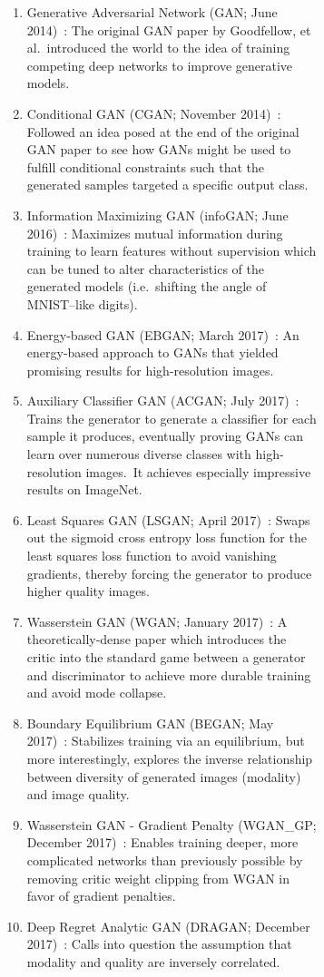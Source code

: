 \documentclass[conference]{IEEEtran}
\begin{document}
\begin{figure}[!h]
\begin{figure}[!h]
    \begin{enumerate}
        \item Generative Adversarial Network (GAN; June 2014)~\cite{goodfellow2014generative}: The original GAN paper by Goodfellow, et al.\ introduced the world to the idea of training competing deep networks to improve generative models.
        \item Conditional GAN (CGAN; November 2014)~\cite{mirza2014conditional}: Followed an idea posed at the end of the original GAN paper to see how GANs might be used to fulfill conditional constraints such that the generated samples targeted a specific output class.
        \item Information Maximizing GAN (infoGAN; June 2016)~\cite{chen2016infogan}: Maximizes mutual information during training to learn features without supervision which can be tuned to alter characteristics of the generated models (i.e.\ shifting the angle of MNIST--like digits).
        \item Energy-based GAN (EBGAN; March 2017)~\cite{zhao2017energybased}: An energy-based approach to GANs that yielded promising results for high-resolution images.
        \item Auxiliary Classifier GAN (ACGAN; July 2017)~\cite{odena2017conditional}: Trains the generator to generate a classifier for each sample it produces, eventually proving GANs can learn over numerous diverse classes with high-resolution images.\ It achieves especially impressive results on ImageNet.
        \item Least Squares GAN (LSGAN; April 2017)~\cite{mao2017squares}: Swaps out the sigmoid cross entropy loss function for the least squares loss function to avoid vanishing gradients, thereby forcing the generator to produce higher quality images.
        \item Wasserstein GAN (WGAN; January 2017)~\cite{arjovsky2017wasserstein}: A theoretically-dense paper which introduces the critic into the standard game between a generator and discriminator to achieve more durable training and avoid mode collapse.
        \item Boundary Equilibrium GAN (BEGAN; May 2017)~\cite{berthelot2017began}: Stabilizes training via an equilibrium, but more interestingly, explores the inverse relationship between diversity of generated images (modality) and image quality.
        \item Wasserstein GAN - Gradient Penalty (WGAN\_GP; December 2017)~\cite{gulrajani2017improved}: Enables training deeper, more complicated networks than previously possible by removing critic weight clipping from WGAN in favor of gradient penalties.
        \item Deep Regret Analytic GAN (DRAGAN; December 2017)~\cite{kodali2017convergence}: Calls into question the assumption that modality and quality are inversely correlated.
    \end{enumerate}


\end{figure}
\end{figure}
\end{document}
